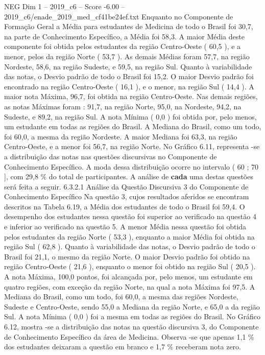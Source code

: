 \begin{textsample}{NEG Dim 1 – 2019\_c6 – Score -6.00 – 2019\_c6/enade\_2019\_med\_cf41be24ef.txt}
Enquanto no Componente de Formação Geral a Média para estudantes de Medicina de todo o Brasil foi 30,7, na parte de Conhecimento Específico, a Média foi 58,3.
A maior Média deste componente foi obtida pelos estudantes da região Centro-Oeste ( 60,5 ), e a menor, pelos da região Norte ( 53,7 ).
As demais Médias foram 57,7, na região Nordeste, 58,6, na região Sudeste, e 59,5, na região Sul.
Quanto à variabilidade das notas, o Desvio padrão de todo o Brasil foi 15,2.
O maior Desvio padrão foi encontrado na região Centro-Oeste ( 16,1 ), e o menor, na região Sul ( 14,4 ).
A maior nota Máxima, 96,7, foi obtida na região Centro-Oeste.
Nas demais regiões, as notas Máximas foram : 91,7, na região Norte, 95,0, na Nordeste, 94,2, na Sudeste, e 89,2, na região Sul.
A nota Mínima ( 0,0 ) foi obtida por, pelo menos, um estudante em todas as regiões do Brasil.
A Mediana do Brasil, como um todo, foi 60,0, a mesma da região Nordeste.
A maior Mediana foi 63,3, na região Centro-Oeste, e a menor foi 56,7, na região Norte.
No Gráfico 6.11, representa -se a distribuição das notas nas questões discursivas no Componente de Conhecimento Específico.
A moda dessa distribuição ocorre no intervalo ( 60 ; 70 ], com 29,8 \% do total de participantes.
A análise de \textbf{cada} uma destas questões será feita a seguir. 6.3.2.1 Análise da Questão Discursiva 3 do Componente de Conhecimento Específico Na questão 3, cujos resultados aferidos se encontram descritos na Tabela 6.19, a Média dos estudantes de todo o Brasil foi 59,4.
O desempenho dos estudantes nessa questão foi superior ao verificado na questão 4 e inferior ao verificado na questão 5.
A menor Média nessa questão foi obtida pelos estudantes da região Norte ( 53,3 ), enquanto a maior Média foi obtida na região Sul ( 62,8 ).
Quanto à variabilidade das notas, o Desvio padrão de todo o Brasil foi 21,1, o mesmo da região Norte.
O maior Desvio padrão foi obtido na região Centro-Oeste ( 21,6 ), enquanto o menor foi obtido na região Sul ( 20,5 ).
A nota Máxima, 100,0 pontos, foi alcançada por, pelo menos, um estudante em quatro regiões, com exceção da região Norte, na qual a nota Máxima foi 97,5.
A Mediana do Brasil, como um todo, foi 60,0, a mesma das regiões Nordeste, Sudeste e Centro-Oeste, sendo 55,0 a Mediana da região Norte, e 65,0 a da região Sul.
A nota Mínima ( 0,0 ) foi a mesma em todas as regiões do Brasil.
No Gráfico 6.12, mostra -se a distribuição das notas na questão discursiva 3, do Componente de Conhecimento Específico da área de Medicina.
Observa -se que apenas 1,1 \% dos estudantes deixaram a questão em branco e 1,7 \% receberam nota zero.

\end{textsample}

